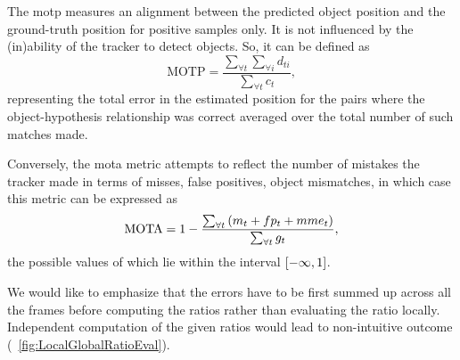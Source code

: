 The \gls{motp} measures an alignment between the predicted object position and the ground-truth position for positive samples only. It is not influenced by the (in)ability of the tracker to detect objects. So, it can be defined as
\begin{equation}
    \label{eq:MOTPMetric}
    \text{MOTP} = \frac{\sum_{\forall t} \sum_{\forall i} d_{ti}}{\sum_{\forall t} c_t},
\end{equation}
representing the total error in the estimated position for the pairs where the object-hypothesis relationship was correct averaged over the total number of such matches made.

Conversely, the \gls{mota} metric attempts to reflect the number of mistakes the tracker made in terms of misses, false positives, object mismatches, in which case this metric can be expressed as
\begin{equation}
    \label{eq:MOTAMetric}
    \text{MOTA} = 1 - \frac{\sum_{\forall t} \left( {m_t + fp_t + mme_t} \right)}{\sum_{\forall t} g_t},
\end{equation}
the possible values of which lie within the interval $\left[ {-\infty, 1} \right]$.

We would like to emphasize that the errors have to be first summed up across all the frames before computing the ratios rather than evaluating the ratio locally. Independent computation of the given ratios would lead to non-intuitive outcome (\figtext{}~\ref{fig:LocalGlobalRatioEval}).

